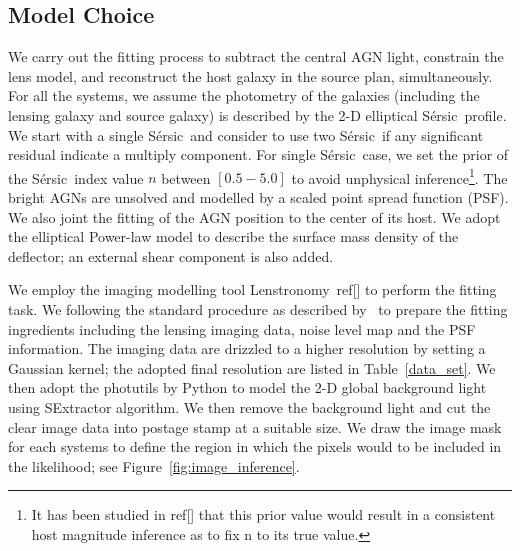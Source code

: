 \documentclass[fleqn,usenatbib]{mnras}
\newcommand{\sersic}{S\'ersic}
\newcommand{\lenstronomy}{{\sc Lenstronomy}}
\begin{document}
\subsection{Model Choice}
We carry out the fitting process to subtract the central AGN light, constrain the lens model, and reconstruct the host galaxy in the source plan, simultaneously.
For all the systems, we assume the photometry of the galaxies (including the lensing galaxy and source galaxy) is described by the 2-D elliptical \sersic\ profile. We start with a single \sersic\ and consider to use two \sersic\ if any significant residual indicate a multiply component. For single \sersic\ case, we set the prior of the \sersic\ index value $n$ between $[0.5-5.0]$ to avoid unphysical inference\footnote{It has been studied in ref[] that this prior value would result in a consistent host magnitude inference as to fix n to its true value.}. The bright AGNs are unsolved and modelled by a scaled point spread function (PSF). We also joint the fitting of the AGN position to the center of its host.
 We adopt the elliptical Power-law model to describe the surface mass density of the deflector; an external shear component is also added.

We employ the imaging modelling tool \lenstronomy~ref[] to perform the fitting task. We following the standard procedure as described by~\citet{Ding2020} to prepare the fitting ingredients including the lensing imaging data, noise level map and the PSF information. The imaging data are drizzled to a higher resolution by setting a Gaussian kernel; the adopted final resolution are listed in Table~\ref{data_set}. We then adopt the {\sc photutils} by Python to model the 2-D global background light using SExtractor algorithm. We then remove the background light and cut the clear image data into postage stamp at a suitable size. We draw the image mask for each systems to define the region in which the pixels would to be included in the likelihood; see Figure~\ref{fig:image_inference}.
\end{document}
